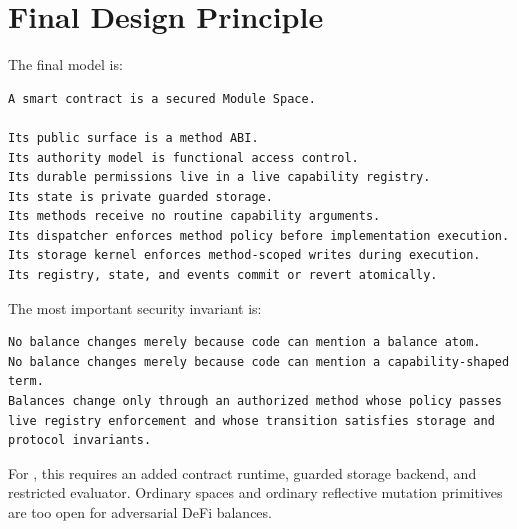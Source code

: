 \section{Final Design Principle}

The final \SCS{} model is:

\begin{lstlisting}
A smart contract is a secured Module Space.

Its public surface is a method ABI.
Its authority model is functional access control.
Its durable permissions live in a live capability registry.
Its state is private guarded storage.
Its methods receive no routine capability arguments.
Its dispatcher enforces method policy before implementation execution.
Its storage kernel enforces method-scoped writes during execution.
Its registry, state, and events commit or revert atomically.
\end{lstlisting}

The most important security invariant is:

\begin{lstlisting}
No balance changes merely because code can mention a balance atom.
No balance changes merely because code can mention a capability-shaped term.
Balances change only through an authorized method whose policy passes live registry enforcement and whose transition satisfies storage and protocol invariants.
\end{lstlisting}

For \PeTTa{}, this requires an added contract runtime, guarded storage backend, and restricted evaluator. Ordinary \PeTTa{} spaces and ordinary reflective mutation primitives are too open for adversarial DeFi balances.
